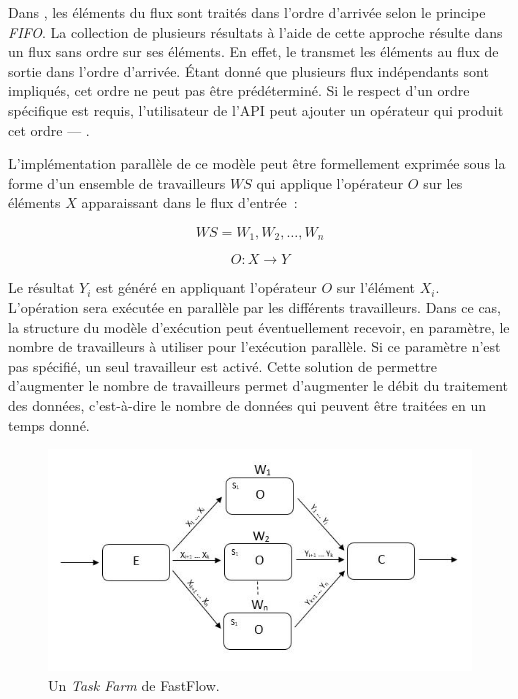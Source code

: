 Dans , les \'el\'ements du flux sont trait\'es dans l'ordre d'arriv\'ee selon le principe \emph{FIFO}. La collection de plusieurs r\'esultats \`a l'aide de cette approche r\'esulte dans un flux sans ordre sur ses \'el\'ements. En effet, le  transmet les \'el\'ements au flux de sortie dans l'ordre d'arriv\'ee. \'Etant donn\'e que plusieurs flux ind\'ependants sont impliqu\'es, cet ordre ne peut pas \^etre pr\'ed\'etermin\'e. Si le respect d'un  ordre sp\'ecifique est requis, l'utilisateur de l'API peut ajouter un op\'erateur qui produit cet ordre --- .

L'impl\'ementation parall\`ele de ce mod\`ele peut \^etre formellement
exprim\'ee sous la forme d'un ensemble de travailleurs $WS$ qui
applique l'op\'erateur $O$ sur les \'el\'ements $X$ apparaissant dans
le flux d'entr\'ee~:

\[
	WS = {W_1, W_2,\ldots, W_n}
\]

\[
	O : X \rightarrow Y
\]

Le r\'esultat $Y_i$ est g\'en\'er\'e en appliquant l'op\'erateur $O$ sur l'\'el\'ement $X_i$. L'op\'eration sera ex\'ecut\'ee en parall\`ele par les diff\'erents travailleurs. Dans ce cas, la structure du mod\`ele d'ex\'ecution peut \'eventuellement recevoir, en param\`etre, le nombre de travailleurs \`a utiliser pour l'ex\'ecution parall\`ele. Si ce param\`etre n'est pas sp\'ecifi\'e, un seul travailleur est activ\'e. Cette solution de permettre d'augmenter le nombre de travailleurs permet d'augmenter le d\'ebit du traitement des donn\'ees, c'est-\`a-dire le nombre de donn\'ees qui peuvent \^etre trait\'ees en un temps donn\'e.

\begin{figure}[ht]
\centering
     \includegraphics[width=1.0\textwidth]{Figures/ParallelismeTaskFarm.jpg}
      \caption{Un \emph{Task Farm} de FastFlow.}
       \label{ParallelismeTaskFarm.fig}
\end{figure}




